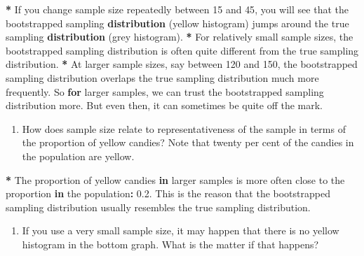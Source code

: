 \documentclass[a4paper]{book}
\newenvironment{Shaded}{\begin{snugshade}}{\end{snugshade}}
\newcommand{\KeywordTok}[1]{\textcolor[rgb]{0,0,0}{\textbf{#1}}}
\newcommand{\DecValTok}[1]{\textcolor[rgb]{0.00,0.00,0.00}{#1}}
\newcommand{\FloatTok}[1]{\textcolor[rgb]{0.00,0.00,0.00}{#1}}
\newcommand{\StringTok}[1]{\textcolor[rgb]{0.00,0.00,0.00}{#1}}
\newcommand{\ControlFlowTok}[1]{\textcolor[rgb]{0.00,0.00,0.00}{\textbf{#1}}}
\newcommand{\OperatorTok}[1]{\textcolor[rgb]{0.00,0.00,0.00}{\textbf{#1}}}
\newcommand{\NormalTok}[1]{#1}
\providecommand{\tightlist}{%
  \setlength{\itemsep}{0pt}\setlength{\parskip}{0pt}}
\theoremstyle{definition}
\theoremstyle{definition}
\theoremstyle{definition}
\theoremstyle{remark}
\begin{document}
\begin{Shaded}
\begin{Highlighting}[]
\OperatorTok{*}\StringTok{ }\NormalTok{If you change sample size repeatedly between }\DecValTok{15}\NormalTok{ and }\DecValTok{45}\NormalTok{, you will see that}
\NormalTok{the bootstrapped sampling }\KeywordTok{distribution}\NormalTok{ (yellow histogram) jumps around the}
\NormalTok{true sampling }\KeywordTok{distribution}\NormalTok{ (grey histogram).}
\OperatorTok{*}\StringTok{ }\NormalTok{For relatively small sample sizes, the bootstrapped sampling distribution is}
\NormalTok{often quite different from the true sampling distribution.}
\OperatorTok{*}\StringTok{ }\NormalTok{At larger sample sizes, say between }\DecValTok{120}\NormalTok{ and }\DecValTok{150}\NormalTok{, the bootstrapped sampling}
\NormalTok{distribution overlaps the true sampling distribution much more frequently. So}
\ControlFlowTok{for}\NormalTok{ larger samples, we can trust the bootstrapped sampling distribution more.}
\NormalTok{But even then, it can sometimes be quite off the mark.}
\end{Highlighting}
\end{Shaded}

\begin{enumerate}
\def\labelenumi{\arabic{enumi}.}
\setcounter{enumi}{1}
\tightlist
\item
  How does sample size relate to representativeness of the sample in
  terms of the proportion of yellow candies? Note that twenty per cent
  of the candies in the population are yellow.
\end{enumerate}

\begin{Shaded}
\begin{Highlighting}[]
\OperatorTok{*}\StringTok{ }\NormalTok{The proportion of yellow candies }\ControlFlowTok{in}\NormalTok{ larger samples is more often close to}
\NormalTok{the proportion }\ControlFlowTok{in}\NormalTok{ the population}\OperatorTok{:}\StringTok{ }\FloatTok{0.2}\NormalTok{. This is the reason that the}
\NormalTok{bootstrapped sampling distribution usually resembles the true sampling}
\NormalTok{distribution.}
\end{Highlighting}
\end{Shaded}

\begin{enumerate}
\def\labelenumi{\arabic{enumi}.}
\setcounter{enumi}{2}
\tightlist
\item
  If you use a very small sample size, it may happen that there is no
  yellow histogram in the bottom graph. What is the matter if that
  happens?
\end{enumerate}
\end{document}
